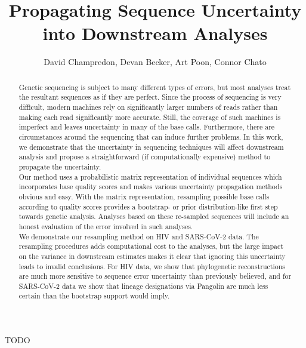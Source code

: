 \documentclass[
]{article}
\title{Propagating Sequence Uncertainty into Downstream Analyses}
\author{David Champredon, Devan Becker, Art Poon, Connor Chato}
\date{}
\begin{document}
\maketitle
\begin{abstract}
Genetic sequencing is subject to many different types of errors, but
most analyses treat the resultant sequences as if they are perfect.
Since the process of sequencing is very difficult, modern machines rely
on significantly larger numbers of reads rather than making each read
significantly more accurate. Still, the coverage of such machines is
imperfect and leaves uncertainty in many of the base calls. Furthermore,
there are circumstances around the sequencing that can induce further
problems. In this work, we demonstrate that the uncertainty in
sequencing techniques will affect downstream analysis and propose a
straightforward (if computationally expensive) method to propagate the
uncertainty.\\
Our method uses a probabilistic matrix representation of individual
sequences which incorporates base quality scores and makes various
uncertainty propagation methods obvious and easy. With the matrix
representation, resampling possible base calls according to quality
scores provides a bootstrap- or prior distribution-like first step
towards genetic analysis. Analyses based on these re-sampled sequences
will include an honest evaluation of the error involved in such
analyses.\\
We demonstrate our resampling method on HIV and SARS-CoV-2 data. The
resampling procedures adds computational cost to the analyses, but the
large impact on the variance in downstream estimates makes it clear that
ignoring this uncertainty leads to invalid conclusions. For HIV data, we
show that phylogenetic reconstructions are much more sensitive to
sequence error uncertainty than previously believed, and for SARS-CoV-2
data we show that lineage designations via Pangolin are much less
certain than the bootstrap support would imply.
\end{abstract}

TODO
\end{document}
